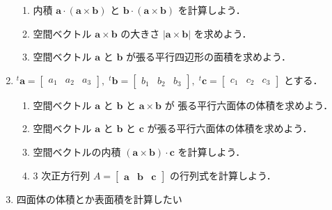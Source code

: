 \documentclass[11pt, uplatex, dvipdfmx]{jsarticle}
\begin{document}
\begin{enumerate}[label=\ref{sec:determinant}.\arabic*]
  \vspace{1zh}

  \begin{enumerate}[label=(\arabic*)]
    \setlength{\itemsep}{1ex}
    
  \item 内積 $\bm{a} \cdot (\bm{a} \times \bm{b})$ と $\bm{b}\cdot ( \bm{a} \times \bm{b})$ を計算しよう．

  \item 空間ベクトル $\bm{a} \times \bm{b}$ の大きさ $|\bm{a} \times \bm{b}|$ を求めよう．

  \item 空間ベクトル $\bm{a}$ と $\bm{b}$ が張る平行四辺形の面積を求めよう．
    
  \end{enumerate}

\item ${}^{t}\bm{a}=\left[
    \begin{array}{ccc}
      a_1 & a_2 & a_3
    \end{array}
  \right], \; {}^{t}\bm{b}=\left[
    \begin{array}{ccc}
      b_1 & b_2 & b_3
    \end{array}
  \right], \; {}^{t}\bm{c} = \left[
    \begin{array}{ccc}
      c_1 & c_2 & c_3
    \end{array}
  \right]$ とする．

  \vspace{1zh}
  
  \begin{enumerate}[label=(\arabic*)]
    \setlength{\itemsep}{1ex}
    
  \item 空間ベクトル $\bm{a}$ と $\bm{b}$ と $\bm{a} \times \bm{b}$ が
    張る平行六面体の体積を求めよう．
    
  \item 空間ベクトル $\bm{a}$ と $\bm{b}$ と $\bm{c}$ が張る平行六面体の体積を求めよう．

  \item 空間ベクトルの内積 $(\bm{a} \times \bm{b}) \cdot \bm{c}$ を計算しよう．

  \item $3$ 次正方行列 $A=\left[
      \begin{array}{ccc}
        \bm{a} & \bm{b} & \bm{c}
      \end{array}
    \right]$ の行列式を計算しよう．
      
  \end{enumerate}
  
\item 四面体の体積とか表面積を計算したい
\end{enumerate}
\end{document}
